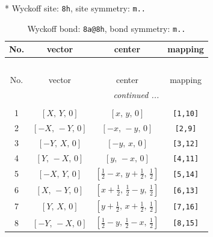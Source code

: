 \documentclass[fleqn,8pt]{jsarticle}
\begin{document}
* Wyckoff site: {\tt 8h}, site symmetry: {\tt m..}
\renewcommand{\arraystretch}{1.2}
\begin{longtable}{cccc}
\caption{Wyckoff bond: {\tt 8a@8h}, bond symmetry: {\tt m..}}
 \\
 \hline \hline
No. & vector & center & mapping \\ \hline \endfirsthead

\multicolumn{3}{l}{\tablename\ \thetable{}} \\
 \hline \hline
No. & vector & center & mapping \\ \hline \endhead

 \hline \hline
\multicolumn{3}{r}{\footnotesize\it continued ...} \\ \endfoot

 \hline \hline
\multicolumn{3}{r}{} \\ \endlastfoot

1 & $\left[ X,\, Y,\, 0 \right]$ & $\left[ x,\, y,\, 0 \right]$ & {\tt [1,10]} \\ \hline
2 & $\left[ - X,\, - Y,\, 0 \right]$ & $\left[ - x,\, - y,\, 0 \right]$ & {\tt [2,9]} \\ \hline
3 & $\left[ - Y,\, X,\, 0 \right]$ & $\left[ - y,\, x,\, 0 \right]$ & {\tt [3,12]} \\ \hline
4 & $\left[ Y,\, - X,\, 0 \right]$ & $\left[ y,\, - x,\, 0 \right]$ & {\tt [4,11]} \\ \hline
5 & $\left[ - X,\, Y,\, 0 \right]$ & $\left[ \frac{1}{2} - x,\, y + \frac{1}{2},\, \frac{1}{2} \right]$ & {\tt [5,14]} \\ \hline
6 & $\left[ X,\, - Y,\, 0 \right]$ & $\left[ x + \frac{1}{2},\, \frac{1}{2} - y,\, \frac{1}{2} \right]$ & {\tt [6,13]} \\ \hline
7 & $\left[ Y,\, X,\, 0 \right]$ & $\left[ y + \frac{1}{2},\, x + \frac{1}{2},\, \frac{1}{2} \right]$ & {\tt [7,16]} \\ \hline
8 & $\left[ - Y,\, - X,\, 0 \right]$ & $\left[ \frac{1}{2} - y,\, \frac{1}{2} - x,\, \frac{1}{2} \right]$ & {\tt [8,15]} \\
\end{longtable}
\renewcommand{\arraystretch}{1.2}
\end{document}
